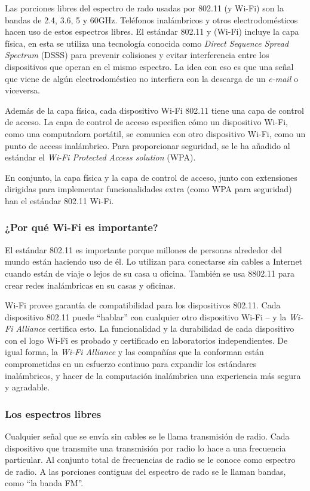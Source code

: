 \documentclass[10pt,journal,compsoc]{IEEEtran}
\begin{document}
Las porciones libres del espectro de rado usadas por 802.11 (y Wi-Fi) son la bandas de 2.4, 3.6, 5 y 60GHz. Teléfonos inalámbricos y otros electrodomésticos hacen uso de estos espectros libres. El estándar 802.11 y (Wi-Fi) incluye la capa física, en esta se utiliza una tecnología conocida como \emph{Direct Sequence Spread Spectrum} (DSSS) para prevenir colisiones y evitar interferencia entre los dispositivos que operan en el mismo espectro. La idea con eso es que una señal que viene de algún electrodoméstico no interfiera con la descarga de un \emph{e-mail} o viceversa. 

Además de la capa física, cada dispositivo Wi-Fi 802.11 tiene una capa de control de acceso. La capa de control de acceso especifica cómo un dispositivo Wi-Fi, como una computadora portátil, se comunica con otro dispositivo Wi-Fi, como un punto de access inalámbrico. Para proporcionar seguridad, se le ha añadido al estándar el \emph{Wi-Fi Protected Access solution} (WPA). 

En conjunto, la capa física y la capa de control de acceso, junto con extensiones dirigidas para implementar funcionalidades extra (como WPA para seguridad) han el estándar 802.11 Wi-Fi.

\subsubsection{¿Por qué Wi-Fi es importante?}
El estándar 802.11 es importante porque millones de personas alrededor del mundo están haciendo uso de él. Lo utilizan para conectarse sin cables a Internet cuando están de viaje o lejos de su casa u oficina. También se usa 8802.11 para crear redes inalámbricas en su casas y oficinas.

Wi-Fi provee garantía de compatibilidad para los dispositivos 802.11. Cada dispositivo 802.11 puede ``hablar'' con cualquier otro dispositivo Wi-Fi -- y la \emph{Wi-Fi Alliance} certifica esto. La funcionalidad y la durabilidad de cada dispositivo con el logo Wi-Fi es probado y certificado en laboratorios independientes. De igual forma, la \emph{Wi-Fi Alliance} y las compañías que la conforman están comprometidas en un esfuerzo continuo para expandir los estándares inalámbricos, y hacer de la computación inalámbrica una experiencia más segura y agradable.

\subsubsection{Los espectros libres}
Cualquier señal que se envía sin cables se le llama transmisión de radio. Cada dispositivo que transmite una transmisión por radio lo hace a una frecuencia particular. Al conjunto total de frecuencias de radio se le conoce como espectro de radio. A las porciones contiguas del espectro de rado se le llaman bandas, como ``la banda FM''.
\end{document}
